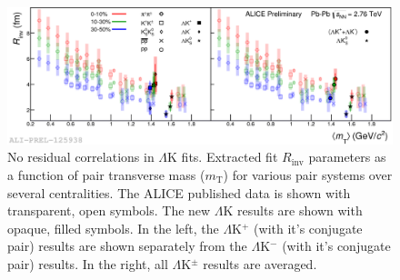 \documentclass[../AnalysisNoteJBuxton.tex]{subfiles}
\begin{document}
\begin{figure}[h]
  \centering
  \includegraphics[width=\textwidth]{7_ResultsAndDiscussion/Figures/2017-Feb-03-mTscalingQMv2_MinvCalc_OutlinedPoints_OthersTransparent.png}
  \caption[$m_{\mathrm{T}}$ Scaling of Radii: No Residuals in Fit]{No residual correlations in $\Lambda$K fits.  Extracted fit $R_{\mathrm{inv}}$ parameters as a function of pair transverse mass ($m_{\mathrm{T}}$) for various pair systems over several centralities. The ALICE published data \cite{Adam:2015vja} is shown with transparent, open symbols.  The new $\Lambda$K results are shown with opaque, filled symbols.  In the left, the $\Lambda$K$^{+}$ (with it's conjugate pair) results are shown separately from the $\Lambda$K$^{-}$ (with it's conjugate pair) results.  In the right, all $\Lambda$K$^{\pm}$ results are averaged.}
  \label{fig:mTScalingOfRadii_NoRes}
\end{figure}

\clearpage
\end{document}
